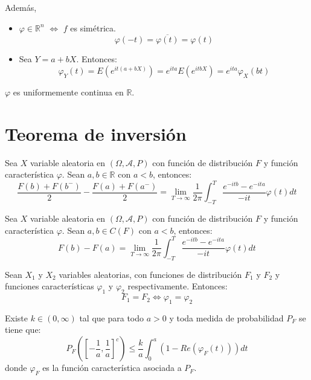Además,
\begin{itemize}
    \item $\varphi \in \mathbb{R}^n$ $\Leftrightarrow$ $f$ es simétrica.
          $$\varphi(-t) = \overline{\varphi(t)} = \varphi(t)$$
    \item Sea $Y = a + bX$. Entonces:
          $$\varphi_Y(t) = E(e^{it(a+bX)}) = e^{ita} E(e^{itbX}) = e^{ita} \varphi_X(bt)$$
\end{itemize}

\begin{theorem}
    $\varphi$ es uniformemente continua en $\mathbb{R}$.
\end{theorem}

\section{Teorema de inversión}
\begin{theorem}
    Sea $X$ variable aleatoria en $(\Omega, \mathcal{A}, P)$ con función de distribución $F$ y función característica $\varphi$.
    Sean $a, b \in \mathbb{R}$ con $a < b$, entonces:
    $$\frac{F(b)+F(b^-)}{2} - \frac{F(a)+F(a^-)}{2} = \lim\limits_{T \to \infty} \frac{1}{2\pi} \int_{-T}^T \frac{e^{-itb}-e^{-ita}}{-it} \varphi(t)dt$$
\end{theorem}

\begin{corollary}
    Sea $X$ variable aleatoria en $(\Omega, \mathcal{A}, P)$ con función de distribución $F$ y función característica $\varphi$.
    Sean $a, b \in C(F)$ con $a < b$, entonces:
    $$F(b) - F(a) = \lim\limits_{T \to \infty} \frac{1}{2\pi} \int_{-T}^T \frac{e^{-itb}-e^{-ita}}{-it} \varphi(t)dt$$
\end{corollary}

\begin{theorem}[Unicidad]
    Sean $X_1$ y $X_2$ variables aleatorias, con funciones de distribución $F_1$ y $F_2$ y funciones características $\varphi_1$ y $\varphi_2$ respectivamente.
    Entonces:
    $$F_1 = F_2 \Leftrightarrow \varphi_1 = \varphi_2$$
\end{theorem}

\begin{theorem}
    Existe $k \in (0, \infty)$ tal que para todo $a > 0$ y toda medida de probabilidad $P_F$ se tiene que:
    $$P_F \left(\left[-\frac{1}{a}, \frac{1}{a}\right]^c\right) \leq \frac{k}{a} \int_0^a (1 - Re(\varphi_F(t)))dt$$
    donde $\varphi_F$ es la función característica asociada a $P_F$.
\end{theorem}

